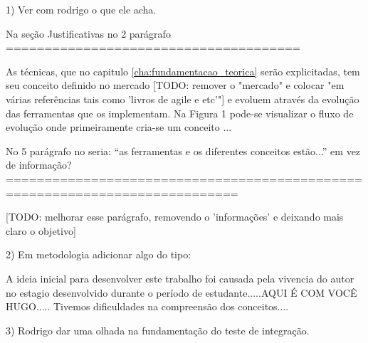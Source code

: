 1) Ver com rodrigo o que ele acha.

  Na seção Justificativas no 2 parágrafo
  ======================================

  As técnicas, que no capitulo \ref{cha:fundamentacao_teorica} serão explicitadas, tem seu conceito definido no mercado [TODO: remover o "mercado" e colocar "em várias referências tais como 'livros de agile e etc'"] e evoluem através da evolução das ferramentas que os implementam. Na Figura 1 pode-se visualizar o fluxo de evolução onde primeiramente cria-se um conceito ...


  No 5 parágrafo no seria: “as ferramentas e os diferentes conceitos estão...” em vez de informação?
  ============================================================================

  [TODO: melhorar esse parágrafo, removendo o 'informações' e deixando mais claro o objetivo]


2) Em metodologia adicionar algo do tipo:

    A ideia inicial para desenvolver este trabalho foi causada pela vivencia do autor no estagio desenvolvido durante o período de estudante.....AQUI É COM VOCÊ HUGO..... Tivemos dificuldades na compreensão dos conceitos....


3) Rodrigo dar uma olhada na fundamentação do teste de integração.